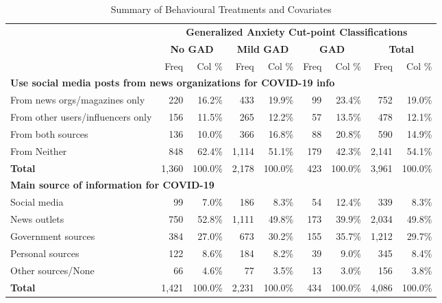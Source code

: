 \documentclass{article}[12pt]
\begin{document}
        \begin{table}[b!]
            \centering
        \begin{threeparttable}
            
            \caption{Summary of Behavioural Treatments and Covariates}
            \begin{tabular}{lrrrrrrrr}
                \hline
                \hline
                 & \multicolumn{8}{c}{\textbf{Generalized Anxiety Cut-point Classifications}} \\
                 & \multicolumn{2}{c}{\textbf{No GAD}} & \multicolumn{2}{c}{\textbf{Mild GAD}} & \multicolumn{2}{c}{\textbf{GAD}} & \multicolumn{2}{c}{\textbf{Total}} \\
                 \cmidrule(lr){2-3}\cmidrule(lr){4-5}\cmidrule(lr){6-7}\cmidrule(lr){8-9}
                &Freq&Col \%&Freq&Col \%&Freq&Col \%&Freq&Col \% \\
                \hline
                \multicolumn{8}{l}{\textbf{Use social media posts from news organizations for COVID-19 info}} \\
                From news orgs/magazines only&220&16.2\%&433&19.9\%&99&23.4\%&752&19.0\% \\
                From other users/influencers only&156&11.5\%&265&12.2\%&57&13.5\%&478&12.1\% \\
                From both sources&136&10.0\%&366&16.8\%&88&20.8\%&590&14.9\% \\
                From Neither&848&62.4\%&1,114&51.1\%&179&42.3\%&2,141&54.1\% \\
                \textbf{Total}&1,360&100.0\%&2,178&100.0\%&423&100.0\%&3,961&100.0\% \\
                \hline
                \multicolumn{8}{l}{\textbf{Main source of information for COVID-19}} \\
                Social media&99&7.0\%&186&8.3\%&54&12.4\%&339&8.3\% \\
                News outlets&750&52.8\%&1,111&49.8\%&173&39.9\%&2,034&49.8\% \\
                Government sources&384&27.0\%&673&30.2\%&155&35.7\%&1,212&29.7\% \\
                Personal sources&122&8.6\%&184&8.2\%&39&9.0\%&345&8.4\% \\
                Other sources/None&66&4.6\%&77&3.5\%&13&3.0\%&156&3.8\% \\
                \textbf{Total}&1,421&100.0\%&2,231&100.0\%&434&100.0\%&4,086&100.0\% \\

\end{tabular}
\end{threeparttable}
\end{table}
\end{document}
